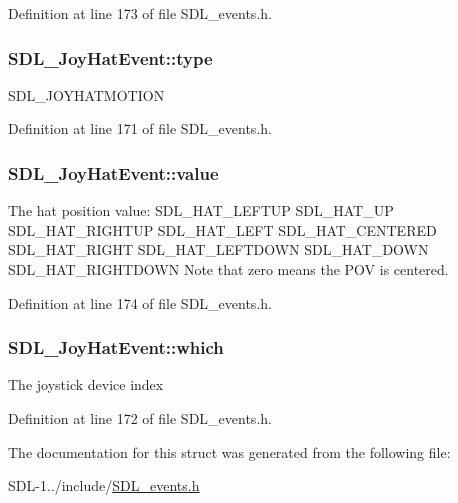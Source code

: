 Definition at line 173 of file S\+D\+L\+\_\+events.\+h.

\hypertarget{struct_s_d_l___joy_hat_event_a1592071b54de4fe74c087945f43a1d3f}{}
\subsubsection[{type}]{ S\+D\+L\+\_\+\+Joy\+Hat\+Event\+::type}\label{struct_s_d_l___joy_hat_event_a1592071b54de4fe74c087945f43a1d3f}
S\+D\+L\+\_\+\+J\+O\+Y\+H\+A\+T\+M\+O\+T\+I\+O\+N 

Definition at line 171 of file S\+D\+L\+\_\+events.\+h.

\hypertarget{struct_s_d_l___joy_hat_event_a52b179a34407449941b61d988ca72ef4}{}
\subsubsection[{value}]{ S\+D\+L\+\_\+\+Joy\+Hat\+Event\+::value}\label{struct_s_d_l___joy_hat_event_a52b179a34407449941b61d988ca72ef4}
The hat position value\+: S\+D\+L\+\_\+\+H\+A\+T\+\_\+\+L\+E\+F\+T\+U\+P S\+D\+L\+\_\+\+H\+A\+T\+\_\+\+U\+P S\+D\+L\+\_\+\+H\+A\+T\+\_\+\+R\+I\+G\+H\+T\+U\+P S\+D\+L\+\_\+\+H\+A\+T\+\_\+\+L\+E\+F\+T S\+D\+L\+\_\+\+H\+A\+T\+\_\+\+C\+E\+N\+T\+E\+R\+E\+D S\+D\+L\+\_\+\+H\+A\+T\+\_\+\+R\+I\+G\+H\+T S\+D\+L\+\_\+\+H\+A\+T\+\_\+\+L\+E\+F\+T\+D\+O\+W\+N S\+D\+L\+\_\+\+H\+A\+T\+\_\+\+D\+O\+W\+N S\+D\+L\+\_\+\+H\+A\+T\+\_\+\+R\+I\+G\+H\+T\+D\+O\+W\+N Note that zero means the P\+O\+V is centered. 

Definition at line 174 of file S\+D\+L\+\_\+events.\+h.

\hypertarget{struct_s_d_l___joy_hat_event_a73ba3817ba1265f3878012c21462e74a}{}
\subsubsection[{which}]{ S\+D\+L\+\_\+\+Joy\+Hat\+Event\+::which}\label{struct_s_d_l___joy_hat_event_a73ba3817ba1265f3878012c21462e74a}
The joystick device index 

Definition at line 172 of file S\+D\+L\+\_\+events.\+h.



The documentation for this struct was generated from the following file\+:\begin{DoxyCompactItemize}
\item 
S\+D\+L-\/1../include/\hyperlink{_s_d_l__events_8h}{S\+D\+L\+\_\+events.\+h}\end{DoxyCompactItemize}
